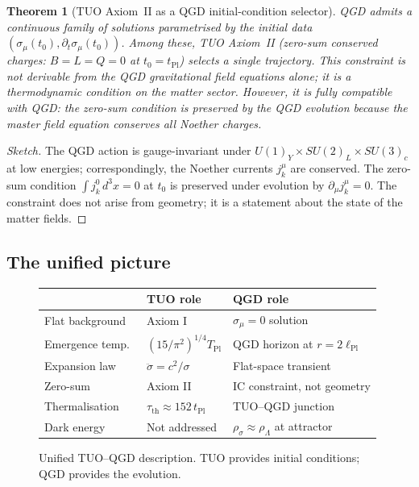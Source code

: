 \documentclass[11pt,a4paper]{article}
\theoremstyle{plain}
\newtheorem{theorem}{Theorem}[section]
\theoremstyle{definition}
\theoremstyle{remark}
\newcommand{\lPl}{\ell_{\mathrm{Pl}}}
\newcommand{\TPl}{T_{\mathrm{Pl}}}
\begin{document}
\begin{theorem}[TUO Axiom~II as a QGD initial-condition selector]
\label{thm:axiom2}
QGD admits a continuous family of solutions parametrised by the initial
data $(\sigma_\mu(t_0), \partial_t\sigma_\mu(t_0))$.  Among these,
TUO Axiom~II (zero-sum conserved charges: $B = L = Q = 0$ at $t_0 = t_\mathrm{Pl}$)
selects a single trajectory.  This constraint is not derivable from the
QGD gravitational field equations alone; it is a thermodynamic condition
on the matter sector.  However, it is fully compatible with QGD: the zero-sum
condition is preserved by the QGD evolution because the master field equation
conserves all Noether charges.
\end{theorem}

\begin{proof}[Sketch]
The QGD action is gauge-invariant under $U(1)_Y \times SU(2)_L \times SU(3)_c$
at low energies; correspondingly, the Noether currents $j^\mu_k$ are conserved.
The zero-sum condition $\int j^0_k\,d^3x = 0$ at $t_0$ is preserved under
evolution by $\partial_\mu j^\mu_k = 0$.  The constraint does not arise from
geometry; it is a statement about the state of the matter fields.
\end{proof}

\subsection{The unified picture}

\begin{figure}[h]
\centering
\renewcommand{\arraystretch}{1.4}
\begin{tabular}{@{}p{4cm}|p{4cm}|p{4cm}@{}}
  & \textbf{TUO role} & \textbf{QGD role} \\
\hline
Flat background & Axiom I & $\sigma_\mu = 0$ solution \\
Emergence temp.\ & $(15/\pi^2)^{1/4}\TPl$ & QGD horizon at $r = 2\lPl$ \\
Expansion law & $\ddot\sigma = c^2/\sigma$ & Flat-space transient \\
Zero-sum & Axiom II & IC constraint, not geometry \\
Thermalisation & $\tau_\mathrm{th} \approx 152\,t_\mathrm{Pl}$ & TUO--QGD junction \\
Dark energy & Not addressed & $\rho_\sigma \approx \rho_\Lambda$ at attractor \\
\end{tabular}
\caption{Unified TUO--QGD description.  TUO provides initial conditions;
QGD provides the evolution.}
\label{fig:unified}
\end{figure}
\end{document}
